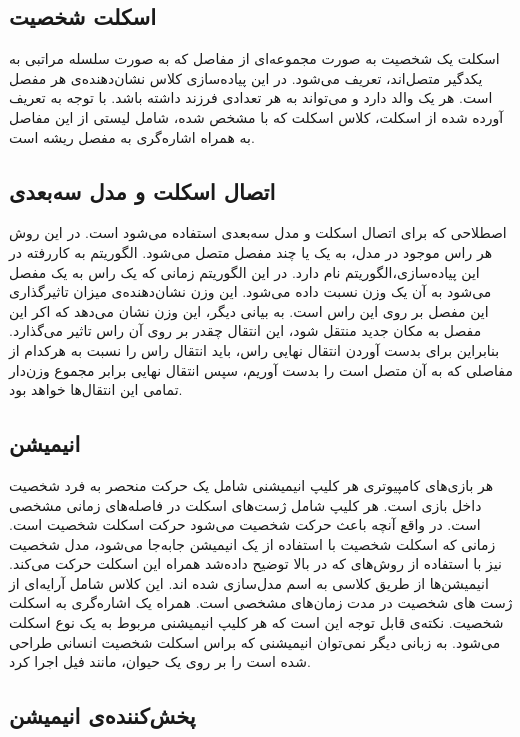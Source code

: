 \subsection{اسکلت شخصیت}

اسکلت یک شخصیت به صورت مجموعه‌ای از مفاصل که به صورت سلسله مراتبی به یکدگیر متصل‌اند، تعریف می‌شود.
در این پیاده‌سازی کلاس 
نشان‌دهنده‌ی هر مفصل است.
هر 
یک والد دارد و می‌تواند به هر تعدادی فرزند داشته باشد.
با توجه به تعریف آورده شده از اسکلت، کلاس اسکلت که با
مشخص شده، شامل لیستی از این مفاصل به همراه اشاره‌گری به مفصل ریشه است.

\subsection{اتصال اسکلت و مدل سه‌بعدی}
اصطلاحی که برای اتصال اسکلت و مدل سه‌بعدی استفاده می‌شود
است.
در این روش هر راس موجود در مدل، به یک یا چند مفصل متصل می‌شود.
الگوریتم به کار‌رفته در این پیاده‌سازی،الگوریتم
نام دارد. در این الگوریتم زمانی که یک راس به یک مفصل می‌شود به آن یک وزن نسبت داده می‌شود.
این وزن نشان‌دهنده‌ی میزان تاثیرگذاری این مفصل بر روی این راس است.
به بیانی دیگر، این وزن نشان می‌دهد که اکر این مفصل به مکان جدید منتقل شود، این انتقال چقدر بر روی آن راس تاثیر می‌گذارد.
بنابراین برای بدست آوردن انتقال نهایی راس، باید انتقال راس را نسبت به هرکدام از مفاصلی که به آن متصل است را بدست آوریم، سپس انتقال نهایی
برابر مجموع وزن‌دار تمامی این انتقال‌ها خواهد بود. 

\subsection{انیمیشن}
هر بازی‌های کامپیوتری هر کلیپ انیمیشنی شامل یک حرکت منحصر به فرد شخصیت داخل بازی است.
هر کلیپ‌ شامل ژست‌های اسکلت در فاصله‌های زمانی مشخصی است. در واقع آنچه باعث حرکت شخصیت می‌شود حرکت اسکلت شخصیت است.
زمانی که اسکلت شخصیت با استفاده از یک انیمیشن جابه‌جا می‌شود، مدل شخصیت نیز با استفاده از روش‌های 
که در بالا توضیح داده‌شد همراه این اسکلت حرکت می‌کند.
انیمیشن‌ها از طریق کلاسی به اسم
مدل‌سازی شده اند. 
این کلاس شامل آرایه‌ای از ژست های شخصیت در مدت زمان‌های مشخصی است. همراه یک اشاره‌گری به اسکلت شخصیت.
نکته‌ی قابل توجه این است که هر کلیپ انیمیشنی مربوط به یک نوع اسکلت می‌شود. به زبانی دیگر نمی‌توان انیمیشنی که براس اسکلت
شخصیت انسانی طراحی شده است را بر روی یک حیوان، مانند فیل اجرا کرد.

\subsection{پخش‌کننده‌ی انیمیشن}

